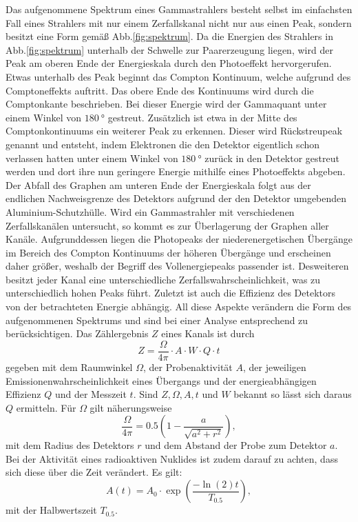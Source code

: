 Das aufgenommene Spektrum eines Gammastrahlers besteht selbst im einfachsten Fall eines Strahlers mit nur einem Zerfallskanal nicht nur aus einen Peak, sondern besitzt eine Form gemäß Abb.\ref{fig:spektrum}. Da die Energien des Strahlers in Abb.\ref{fig:spektrum} unterhalb der Schwelle zur Paarerzeugung liegen, wird der Peak am oberen Ende der Energieskala durch den Photoeffekt hervorgerufen. Etwas unterhalb des Peak beginnt das Compton Kontinuum, welche aufgrund des Comptoneffekts auftritt. Das obere Ende des Kontinuums wird durch die Comptonkante beschrieben. Bei dieser Energie wird der Gammaquant unter einem Winkel von $\SI{180}{\degree}$ gestreut. Zusätzlich ist etwa in der Mitte des Comptonkontinuums ein weiterer Peak zu erkennen. Dieser wird Rückstreupeak genannt und entsteht, indem Elektronen die den Detektor eigentlich schon verlassen hatten unter einem Winkel von $\SI{180}{\degree}$ zurück in den Detektor gestreut werden und dort ihre nun geringere Energie mithilfe eines Photoeffekts abgeben. Der Abfall des Graphen am unteren Ende der Energieskala folgt aus der endlichen Nachweisgrenze des Detektors aufgrund der den Detektor umgebenden Aluminium-Schutzhülle. Wird ein Gammastrahler mit verschiedenen Zerfallskanälen untersucht, so kommt es zur Überlagerung der Graphen aller Kanäle. Aufgrunddessen liegen die Photopeaks der niederenergetischen Übergänge im Bereich des Compton Kontinuums der höheren Übergänge und erscheinen daher größer, weshalb der Begriff des Vollenergiepeaks passender ist. Desweiteren besitzt jeder Kanal eine unterschiedliche Zerfallswahrscheinlichkeit, was zu unterschiedlich hohen Peaks führt. Zuletzt ist auch die Effizienz des Detektors von der betrachteten Energie abhängig. All diese Aspekte verändern die Form des aufgenommenen Spektrums und sind bei einer Analyse entsprechend zu berücksichtigen. Das Zählergebnis $Z$ eines Kanals ist durch
\begin{equation}
    Z = \frac{\Omega}{4 \pi}\cdot A \cdot W \cdot Q \cdot t \label{eq:ZZZ}
\end{equation}
gegeben mit dem Raumwinkel $\Omega$, der Probenaktivität $A$, der jeweiligen Emissionenwahrscheinlichkeit eines Übergangs und der energieabhängigen Effizienz $Q$ und der Messzeit $t$. Sind $Z,\Omega,A,t$ und $W$ bekannt so lässt sich daraus $Q$ ermitteln. Für $\Omega$ gilt näherungsweise
\begin{equation}
    \frac{\Omega}{4 \pi} = 0.5 \left( 1- \frac{a}{\sqrt{a^2 + r^2}}\right) ,\label{eq:omega}
\end{equation}
mit dem Radius des Detektors $r$ und dem Abstand der Probe zum Detektor $a$. 
Bei der Aktivität eines radioaktiven Nuklides ist zudem darauf zu achten, dass sich diese über die Zeit verändert. Es gilt:
\begin{equation}
    A(t) = A_0 \cdot \exp\left(\frac{-\ln(2) t }{T_{0.5}}\right), \label{eq:AAA}
\end{equation}
mit der Halbwertszeit $T_{0.5}$.